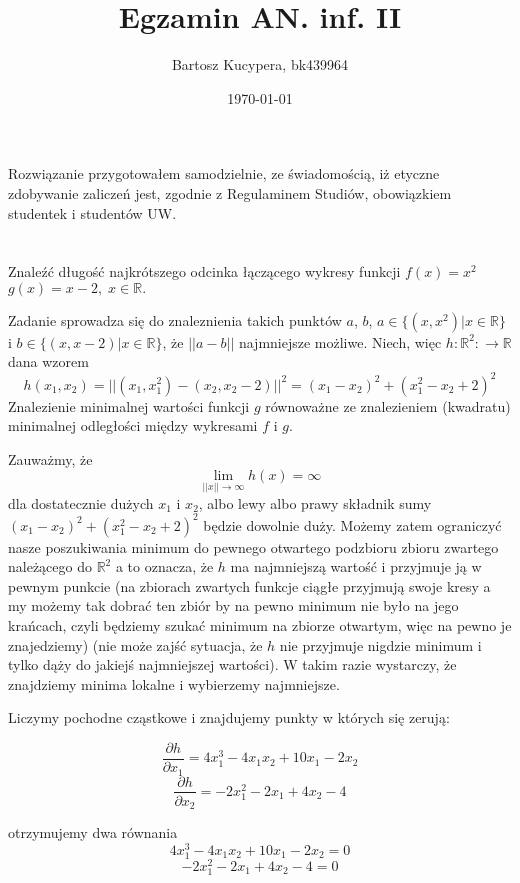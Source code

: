 \documentclass{article}
\title{Egzamin AN. inf. II}
\author{Bartosz Kucypera, bk439964}
\date{\today}
\begin{document}
\maketitle

Rozwiązanie przygotowałem samodzielnie, ze świadomością, iż etyczne zdobywanie zaliczeń jest, zgodnie z Regulaminem Studiów, obowiązkiem studentek i studentów UW.

\section*{}

Znaleźć długość najkrótszego odcinka łączącego wykresy funkcji $f(x) = x^2$ $g(x) = x - 2,\; x \in \mathbb{R}.$

Zadanie sprowadza się do znaleznienia takich punktów $a$, $b$, $a \in \{(x, x^2) | x\in\mathbb{R}\}$ i $b\in \{(x, x-2) | x \in \mathbb{R}\}$, że $||a-b||$ najmniejsze możliwe.
Niech, więc $h : \mathbb{R}^2 : \to \mathbb{R}$ dana wzorem $$h(x_1, x_2) = ||(x_1, x_1^2) - (x_2, x_2-2)||^2 = (x_1-x_2)^2 + (x_1^2 - x_2+2)^2$$
Znalezienie minimalnej wartości funkcji $g$ równoważne ze znalezieniem (kwadratu) minimalnej odległości między wykresami $f$ i $g$.

Zauważmy, że 
$$\lim_{||x|| \to \infty} h(x) = \infty$$
dla dostatecznie dużych $x_1$ i $x_2$, albo lewy albo prawy składnik sumy $(x_1-x_2)^2 + (x_1^2 -x_2+2)^2$ będzie dowolnie duży. \newline Możemy zatem ograniczyć nasze poszukiwania minimum do pewnego otwartego podzbioru zbioru zwartego należącego do $\mathbb{R}^2$ a to oznacza, że $h$ ma najmniejszą wartość i przyjmuje ją w pewnym punkcie (na zbiorach zwartych funkcje ciągłe przyjmują swoje kresy a my możemy tak dobrać ten zbiór by na pewno minimum nie było na jego krańcach, czyli będziemy szukać minimum na zbiorze otwartym, więc na pewno je znajedziemy) (nie może zajść sytuacja, że $h$ nie przyjmuje nigdzie minimum i tylko dąży do jakiejś najmniejszej wartości). \newline
W takim razie wystarczy, że znajdziemy minima lokalne i wybierzemy najmniejsze. \newline

Liczymy pochodne cząstkowe i znajdujemy punkty w których się zerują:

$$ \frac{\partial h}{\partial x_1} = 4x_1^3 - 4x_1x_2 + 10x_1 -2x_2$$
$$\frac{\partial h}{\partial x_2} = -2x_1^2 - 2x_1 + 4x_2 -4$$

otrzymujemy dwa równania
$$4x_1^3 - 4x_1x_2 + 10x_1 -2x_2 = 0$$
$$-2x_1^2 - 2x_1 + 4x_2 -4 = 0$$
\end{document}
